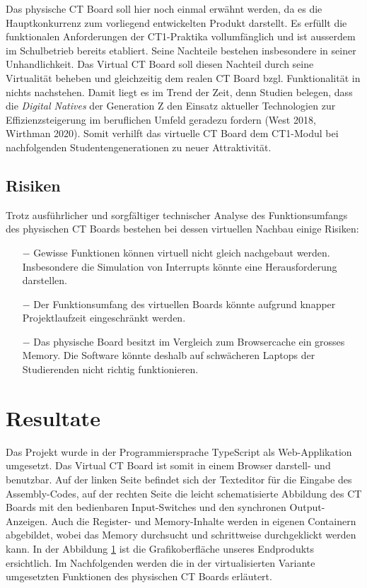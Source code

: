 \documentclass[10pt]{article}
\begin{document}
Das physische CT Board soll hier noch einmal erwähnt werden, da es die Hauptkonkurrenz zum vorliegend entwickelten Produkt darstellt. Es erfüllt die funktionalen Anforderungen der CT1-Praktika vollumfänglich und ist ausserdem im Schulbetrieb bereits etabliert. Seine Nachteile bestehen insbesondere in seiner Unhandlichkeit. Das \glqq Virtual CT Board\grqq{} soll diesen Nachteil durch seine Virtualität beheben und gleichzeitig dem realen CT Board bzgl. Funktionalität in nichts nachstehen. Damit liegt es im Trend der Zeit, denn Studien belegen, dass die \emph{Digital Natives} der Generation Z den Einsatz aktueller Technologien zur Effizienzsteigerung im beruflichen Umfeld geradezu fordern (West 2018, Wirthman 2020). Somit verhilft das virtuelle CT Board dem CT1-Modul bei nachfolgenden Studentengenerationen zu neuer Attraktivität.


\subsection{Risiken}
Trotz ausführlicher und sorgfältiger technischer Analyse des Funktionsumfangs des physischen CT Boards bestehen bei dessen virtuellen Nachbau einige Risiken:
\begin{itemize}
\item[$-$] Gewisse Funktionen können virtuell nicht gleich nachgebaut werden. Insbesondere die Simulation von Interrupts könnte eine Herausforderung darstellen.
\item[$-$] Der Funktionsumfang des virtuellen Boards könnte aufgrund knapper Projektlaufzeit eingeschränkt werden. 
\item[$-$] Das physische Board besitzt im Vergleich zum Browsercache ein grosses Memory. Die Software könnte deshalb auf schwächeren Laptops der Studierenden nicht richtig funktionieren. 
\end{itemize}

\section{Resultate}

Das Projekt wurde in der Programmiersprache TypeScript als Web-Applikation umgesetzt. Das \glqq Virtual CT Board\grqq{} ist somit in einem Browser darstell- und benutzbar. Auf der linken Seite befindet sich der Texteditor für die Eingabe des Assembly-Codes, auf der rechten Seite die leicht schematisierte Abbildung des CT Boards mit den bedienbaren Input-Switches und den synchronen Output-Anzeigen. Auch die Register- und Memory-Inhalte werden in eigenen Containern abgebildet, wobei das Memory durchsucht und schrittweise durchgeklickt werden kann. In der Abbildung \ref{} ist die Grafikoberfläche unseres Endprodukts ersichtlich. Im Nachfolgenden werden die in der virtualisierten Variante umgesetzten Funktionen des physischen CT Boards erläutert.
\end{document}
